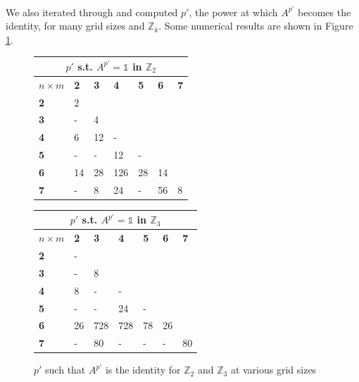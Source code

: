 \documentclass[11pt]{article}
\newcommand{\na}{-}
\newcommand{\fl}{\cellcolor{light-gray}}
\newcommand{\modZ}[1]{$\mathbb{Z}_{#1}$}
\begin{document}
\paragraph{} We also iterated through and computed $p'$, the power at which $A^{p'}$ becomes the identity, for many grid sizes and \modZ{k}. Some numerical results are shown in Figure \ref{cycles-table}.

\begin{figure}[H]
  \caption{$p'$ such that $A^{p'}$ is the identity for \modZ{2} and \modZ{3} at various grid sizes}
  \label{cycles-table}
  \begin{center}
  \begin{tabular}{|l|l|l|l|l|l|l|}
    \hline
    \multicolumn{7}{|c|}{$p'$ s.t. $A^{p'}=\mathbb{1}$ in $\mathbb{Z}_2$} \\ \hline
    $n\times m$&\textbf{2}&\textbf{3}&\textbf{4}&\textbf{5}&\textbf{6}&\textbf{7}\\ \hline
    \textbf{2} & 2   & \fl & \fl & \fl & \fl & \fl \\ \hline
    \textbf{3} & \na & 4   & \fl & \fl & \fl & \fl \\ \hline
    \textbf{4} & 6   & 12  & \na & \fl & \fl & \fl \\ \hline
    \textbf{5} & \na & \na & 12  & \na & \fl & \fl \\ \hline
    \textbf{6} & 14  & 28  & 126 & 28  & 14  & \fl \\ \hline
    \textbf{7} & \na & 8   & 24  & \na & 56  & 8   \\ \hline
  \end{tabular} \begin{tabular}{|l|l|l|l|l|l|l|}
    \hline
    \multicolumn{7}{|c|}{$p'$ s.t. $A^{p'}=\mathbb{1}$ in $\mathbb{Z}_3$} \\ \hline
    $n\times m$&\textbf{2}&\textbf{3}&\textbf{4}&\textbf{5}&\textbf{6}&\textbf{7}\\ \hline
    \textbf{2} & \na & \fl & \fl & \fl & \fl & \fl \\ \hline
    \textbf{3} & \na & 8   & \fl & \fl & \fl & \fl \\ \hline
    \textbf{4} & 8   & \na & \na & \fl & \fl & \fl \\ \hline
    \textbf{5} & \na & \na & 24  & \na & \fl & \fl \\ \hline
    \textbf{6} & 26  & 728 & 728 & 78  & 26  & \fl \\ \hline
    \textbf{7} & \na & 80  & \na & \na & \na & 80  \\ \hline
  \end{tabular}
  \end{center}
\end{figure}
\end{document}
